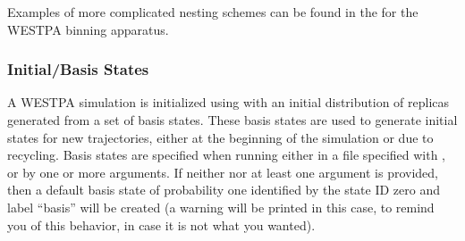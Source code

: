 \documentclass[letterpaper,10pt,english]{sphinxmanual}
\begin{document}
\begin{sphinxVerbatim}[commandchars=\\\{\}]
   
      \PYG{p}{[}\PYG{p}{]}  
    \PYG{p}{[}  \PYG{p}{]}  
    \PYG{p}{[}  \PYG{p}{]}  

  
  
  
 \PYG{p}{[}\PYG{p}{]}
\end{sphinxVerbatim}

Examples of more complicated nesting schemes can be found in the 
for the WESTPA binning apparatus.


\subsubsection{Initial/Basis States}
\label{\detokenize{users_guide/west/setup:initial-basis-states}}
A WESTPA simulation is initialized using  with an initial
distribution of replicas generated from a set of basis states. These basis
states are used to generate initial states for new trajectories, either at the
beginning of the simulation or due to recycling. Basis states are specified
when running  either in a file specified with , or
by one or more  arguments. If neither  nor at
least one  argument is provided, then a default basis state of
probability one identified by the state ID zero and label “basis” will be
created (a warning will be printed in this case, to remind you of this
behavior, in case it is not what you wanted).
\end{document}
